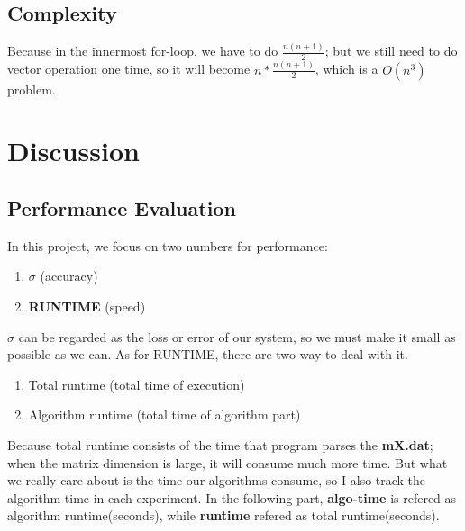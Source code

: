\documentclass{article}
\begin{document}
\subsection{Complexity}
Because in the innermost for-loop, we have to do $\frac{n(n+1)}{2}$; but we still need to do vector operation one time, so it will
become $n * \frac{n(n+1)}{2}$, which is a \boldmath$O(n^3)$ problem.

\section{Discussion}
\subsection{Performance Evaluation}
In this project, we focus on two numbers for performance:
\begin{enumerate}
    \item \boldmath$\sigma$ (accuracy) \\
    \item \textbf{RUNTIME} (speed)
\end{enumerate}

$\sigma$ can be regarded as the loss or error of our system, so we must make it small as possible as we can. As for RUNTIME, there are
two way to deal with it.
\begin{enumerate}
    \item Total runtime (total time of execution) \\
    \item Algorithm runtime (total time of algorithm part)
\end{enumerate}
Because total runtime consists of the time that program parses the \textbf{mX.dat}; when the matrix dimension is large, it will consume
much more time. But what we really care about is the time our algorithms consume, so I also track the algorithm time in each 
experiment. In the following part, \textbf{algo-time} is refered as algorithm runtime(seconds), 
while \textbf{runtime} refered as total runtime(seconds).
\end{document}
